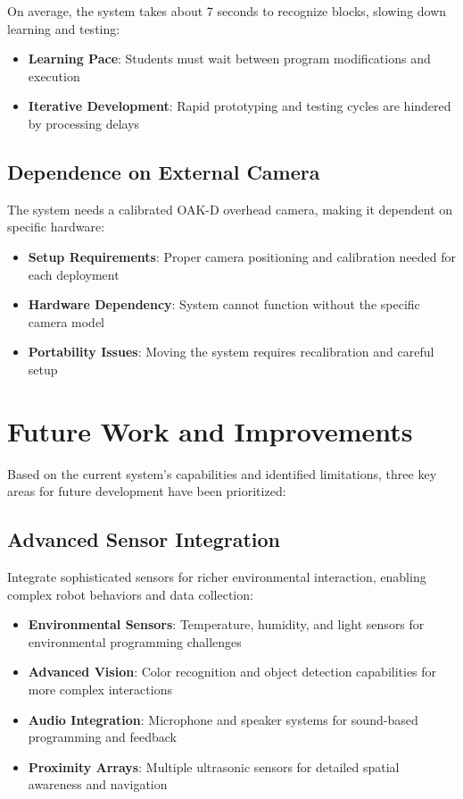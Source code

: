 On average, the system takes about 7 seconds to recognize blocks, slowing down learning and testing:

\begin{itemize}
    \item \textbf{Learning Pace}: Students must wait between program modifications and execution
    \item \textbf{Iterative Development}: Rapid prototyping and testing cycles are hindered by processing delays
\end{itemize}

\subsection{Dependence on External Camera}

The system needs a calibrated OAK-D overhead camera, making it dependent on specific hardware:

\begin{itemize}
    \item \textbf{Setup Requirements}: Proper camera positioning and calibration needed for each deployment
    \item \textbf{Hardware Dependency}: System cannot function without the specific camera model
    \item \textbf{Portability Issues}: Moving the system requires recalibration and careful setup
\end{itemize}

\section{Future Work and Improvements}

Based on the current system's capabilities and identified limitations, three key areas for future development have been prioritized:

\subsection{Advanced Sensor Integration}

Integrate sophisticated sensors for richer environmental interaction, enabling complex robot behaviors and data collection:

\begin{itemize}
    \item \textbf{Environmental Sensors}: Temperature, humidity, and light sensors for environmental programming challenges
    \item \textbf{Advanced Vision}: Color recognition and object detection capabilities for more complex interactions
    \item \textbf{Audio Integration}: Microphone and speaker systems for sound-based programming and feedback
    \item \textbf{Proximity Arrays}: Multiple ultrasonic sensors for detailed spatial awareness and navigation
\end{itemize}

